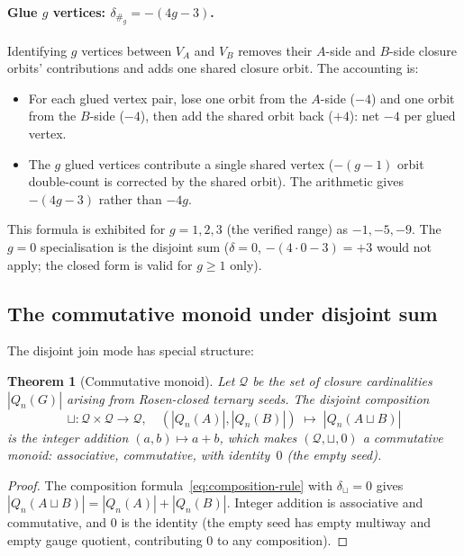 \documentclass[12pt,a4paper]{article}
\newtheorem{theorem}{Theorem}[section]
\theoremstyle{definition}
\theoremstyle{remark}
\newcommand{\Qn}{Q_n}
\newcommand{\glue}{\mathbin{\#}}            %
\begin{document}
\paragraph{Glue $g$ vertices: $\delta_{\glue_g} = -(4g - 3)$.}
Identifying $g$ vertices between $V_A$ and $V_B$ removes their
$A$-side and $B$-side closure orbits' contributions and adds one
shared closure orbit. The accounting is:
\begin{itemize}[leftmargin=2em,topsep=2pt,itemsep=2pt]
\item For each glued vertex pair, lose one orbit from the $A$-side
($-4$) and one orbit from the $B$-side ($-4$), then add the shared
orbit back ($+4$): net $-4$ per glued vertex.
\item The $g$ glued vertices contribute a single shared vertex
($-(g-1)$ orbit double-count is corrected by the shared orbit).
The arithmetic gives $-(4g - 3)$ rather than $-4g$.
\end{itemize}
This formula is exhibited for $g = 1, 2, 3$ (the verified range) as
$-1, -5, -9$. The $g = 0$ specialisation is the disjoint sum
($\delta = 0$, $-(4 \cdot 0 - 3) = +3$ would not apply; the closed
form is valid for $g \ge 1$ only).

\subsection{The commutative monoid under disjoint sum}\label{sec:comp-monoid}

The disjoint join mode has special structure:

\begin{theorem}[Commutative monoid]\label{thm:monoid}
Let $\mathcal{Q}$ be the set of closure cardinalities $|\Qn(G)|$
arising from Rosen-closed ternary seeds. The disjoint composition
\[
\sqcup : \mathcal{Q} \times \mathcal{Q} \to \mathcal{Q}, \quad
(|\Qn(A)|, |\Qn(B)|) \;\mapsto\; |\Qn(A \sqcup B)|
\]
is the integer addition $(a, b) \mapsto a + b$, which makes
$(\mathcal{Q}, \sqcup, 0)$ a commutative monoid: associative,
commutative, with identity~$0$ (the empty seed).
\end{theorem}

\begin{proof}
The composition formula~\eqref{eq:composition-rule} with $\delta_{\sqcup}
= 0$ gives $|\Qn(A \sqcup B)| = |\Qn(A)| + |\Qn(B)|$. Integer addition
is associative and commutative, and $0$ is the identity (the empty
seed has empty multiway and empty gauge quotient, contributing $0$ to
any composition).
\end{proof}
\end{document}
